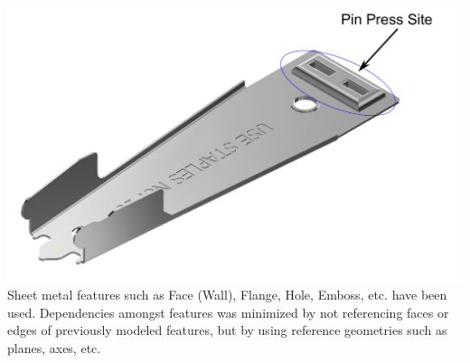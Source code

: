
\begin{minipage}{\linewidth}
\begin{minipage}[c]{0.62\linewidth}
\includegraphics[width=\linewidth,valign=t]{../Common/images/StaplerLower_1_model.pdf}
 \label{fig:results:staplerlowermodel}
Sheet metal features such as Face (Wall), Flange, Hole, Emboss, etc. have been used. Dependencies amongst features was minimized by not referencing faces or edges of previously modeled features, but by using reference geometries such as planes, axes, etc. 
\end{minipage}
\quad
\begin{minipage}[c]{0.3\linewidth}

\end{minipage}
\end{minipage}
